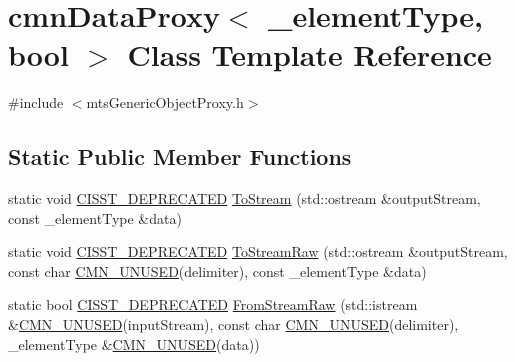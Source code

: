 \hypertarget{classcmn_data_proxy}{\section{cmn\-Data\-Proxy$<$ \-\_\-element\-Type, bool $>$ Class Template Reference}
\label{classcmn_data_proxy}
}


{\ttfamily \#include $<$mts\-Generic\-Object\-Proxy.\-h$>$}

\subsection*{Static Public Member Functions}
\begin{DoxyCompactItemize}
\item 
static void \hyperlink{cmn_portability_8h_a63da7164735f9501be651b1f2bbc0121}{C\-I\-S\-S\-T\-\_\-\-D\-E\-P\-R\-E\-C\-A\-T\-E\-D} \hyperlink{classcmn_data_proxy_aeadcddf8cf3bd2538bfef85586879287}{To\-Stream} (std\-::ostream \&output\-Stream, const \-\_\-element\-Type \&data)
\item 
static void \hyperlink{cmn_portability_8h_a63da7164735f9501be651b1f2bbc0121}{C\-I\-S\-S\-T\-\_\-\-D\-E\-P\-R\-E\-C\-A\-T\-E\-D} \hyperlink{classcmn_data_proxy_aefc4e2285d0128285fa441addbb9ed3c}{To\-Stream\-Raw} (std\-::ostream \&output\-Stream, const char \hyperlink{cmn_portability_8h_a021894e2626935fa2305434b1e893ff6}{C\-M\-N\-\_\-\-U\-N\-U\-S\-E\-D}(delimiter), const \-\_\-element\-Type \&data)
\item 
static bool \hyperlink{cmn_portability_8h_a63da7164735f9501be651b1f2bbc0121}{C\-I\-S\-S\-T\-\_\-\-D\-E\-P\-R\-E\-C\-A\-T\-E\-D} \hyperlink{classcmn_data_proxy_ab073d3697f2844e96abc255813e86c61}{From\-Stream\-Raw} (std\-::istream \&\hyperlink{cmn_portability_8h_a021894e2626935fa2305434b1e893ff6}{C\-M\-N\-\_\-\-U\-N\-U\-S\-E\-D}(input\-Stream), const char \hyperlink{cmn_portability_8h_a021894e2626935fa2305434b1e893ff6}{C\-M\-N\-\_\-\-U\-N\-U\-S\-E\-D}(delimiter), \-\_\-element\-Type \&\hyperlink{cmn_portability_8h_a021894e2626935fa2305434b1e893ff6}{C\-M\-N\-\_\-\-U\-N\-U\-S\-E\-D}(data))
\end{DoxyCompactItemize}


